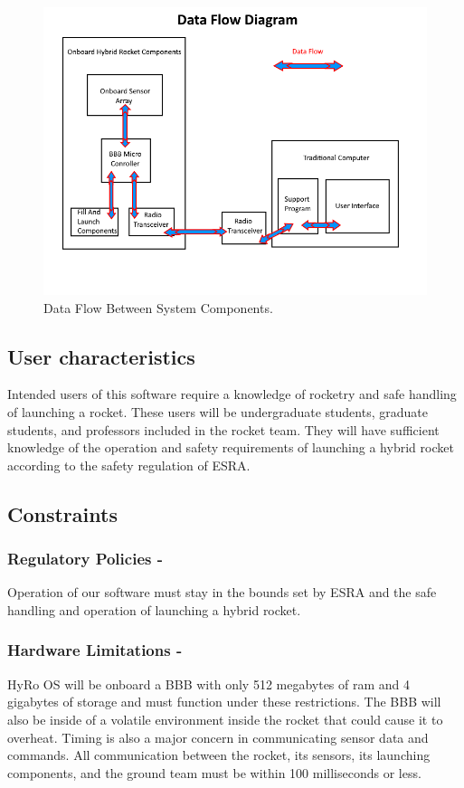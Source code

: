\documentclass[10pt,draftclsnofoot,onecolumn,compsoc]{IEEEtran}
\begin{document}
\begin{figure}[!ht]
  \caption{Data Flow Between System Components.}
  \centering
	\includegraphics[scale=.85]{RocketBlockDiagram}
\end{figure}
\FloatBarrier
\subsection{ User characteristics}
Intended users of this software require a knowledge of rocketry and safe handling of launching a rocket. These users will be undergraduate students, graduate students, and professors included in the rocket team. They will have sufficient knowledge of the operation and safety requirements of launching a hybrid rocket according to the safety regulation of ESRA.

\subsection{Constraints}

\subsubsection{\bf  Regulatory Policies -} Operation of our software must stay in the bounds set by ESRA and the safe handling and operation of launching a hybrid rocket.  
\subsubsection{\bf  Hardware Limitations -}HyRo OS will be onboard a BBB with only 512 megabytes of ram and 4 gigabytes of storage and must function under these restrictions. The BBB will also be inside of a volatile environment inside the rocket that could cause it to overheat. Timing is also a major concern in communicating sensor data and commands. All communication between the rocket, its sensors, its launching components, and the ground team must be within 100 milliseconds or less.
\end{document}
